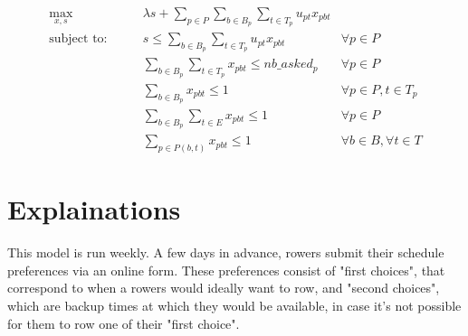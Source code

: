 \documentclass[12pt]{extarticle}
\begin{document}
\begin{align}
	\max_{x, s} \quad			& \lambda s + \sum_{p \in P} \sum_{b \in B_p} \sum_{t \in T_p} u_{pt} x_{pbt}	& \label{eq:obj}\\
	\text{subject to:} \qquad	& s \leq \sum_{b \in B_p} \sum_{t \in T_p} u_{pt} x_{pbt} 						& \forall p \in P \label{eq:min-util}\\
								& \sum_{b \in B_p} \sum_{t \in T_p} x_{pbt} \leq nb\_asked_p					& \forall p \in P \label{eq:training-upper}\\
								& \sum_{b \in B_p} x_{pbt} \leq 1												& \forall p \in P, t \in T_p \label{eq:only-one-boat}\\
								& \sum_{b \in B_p} \sum_{t \in E} x_{pbt} \leq 1								& \forall p \in P \label{eq:exclusive-times}\\
								& \sum_{p \in P(b,t)} x_{pbt} \leq 1											& \forall b \in B, \forall t \in T \label{eq:only-one-person}
\end{align}

\section{Explainations}%
\label{sec:Explainations}

This model is run weekly. A few days in advance, rowers submit their schedule preferences via an online form.
These preferences consist of "first choices", that correspond to when a rowers would ideally want to row, and "second choices", which are backup times at which they would be available, in case it's not possible for them to row one of their "first choice".\\
\end{document}
